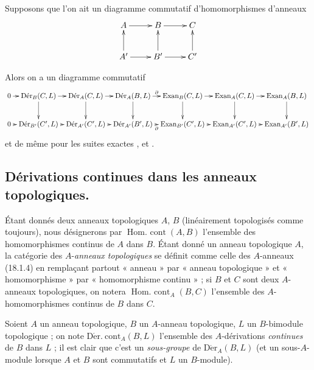 \begin{remark}[20.2.5]
\label{0.20.2.5-fr}
Supposons que l'on ait un diagramme commutatif d'homomorphismes d'anneaux
\[
\xymatrix{
  A \ar[r] & B \ar[r] & C \\
  A' \ar[u] \ar[r] & B' \ar[u] \ar[r] & C' \ar[u]
}
\]

Alors on a un diagramme commutatif
\[
\xymatrix@C=0.5em{
  0 \ar[r] & \operatorname{D\acute{e}r}_B(C,L) \ar[r] \ar[d] &
  \operatorname{D\acute{e}r}_A(C,L) \ar[r] \ar[d] &
  \operatorname{D\acute{e}r}_A(B,L) \ar[r]^-\partial \ar[d] &
  \operatorname{Exan}_B(C,L) \ar[r] \ar[d] &
  \operatorname{Exan}_A(C,L) \ar[r] \ar[d] &
  \operatorname{Exan}_A(B,L) \ar[d] \\
  0 \ar[r] & \operatorname{D\acute{e}r}_{B'}(C',L) \ar[r] &
  \operatorname{D\acute{e}r}_{A'}(C',L) \ar[r] &
  \operatorname{D\acute{e}r}_{A'}(B',L) \ar[r]_-\partial &
  \operatorname{Exan}_{B'}(C',L) \ar[r] &
  \operatorname{Exan}_{A'}(C',L) \ar[r] &
  \operatorname{Exan}_{A'}(B',L)
}
\]
et de même pour les suites exactes ,
 et .
\end{remark}

\subsection{Dérivations continues dans les anneaux topologiques.}
\label{subsection:0.20.3-fr}

\begin{env}[20.3.1]
\label{0.20.3.1-fr}
Étant donnés deux anneaux topologiques $A$, $B$ (linéairement topologisés
comme toujours), nous désignerons par $\operatorname{Hom.\ cont}(A,B)$
l'ensemble des homomorphismes continus de $A$ dans $B$. Étant donné un anneau
topologique $A$, la catégorie des $A$-\emph{anneaux topologiques} se définit comme
celle des $A$-anneaux (18.1.4) en remplaçant partout « anneau » par « anneau
topologique » et « homomorphisme » par « homomorphisme continu » ; si $B$
et $C$ sont deux $A$-anneaux topologiques, on notera
$\operatorname{Hom.\ cont}_A(B,C)$ l'ensemble des $A$-homomorphismes continus
de $B$ dans $C$.

Soient $A$ un anneau topologique, $B$ un $A$-anneau topologique, $L$ un
$B$-bimodule topologique ; on note $\operatorname{D\acute{e}r.\ cont}_A(B,L)$
l'ensemble des $A$-dérivations \emph{continues} de $B$ dans $L$ ; il est clair
que c'est un \emph{sous-groupe} de $\operatorname{D\acute{e}r}_A(B,L)$ (et un
sous-$A$-module lorsque $A$ et $B$ sont commutatifs et $L$ un $B$-module).
\end{env}

